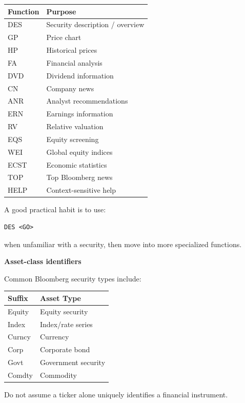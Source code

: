 \documentclass[11pt,letterpaper]{article}
\begin{document}
\begin{center}
\begin{tabularx}{\textwidth}{lX}
\toprule
Function & Purpose \\
\midrule
DES & Security description / overview \\
GP & Price chart \\
HP & Historical prices \\
FA & Financial analysis \\
DVD & Dividend information \\
CN & Company news \\
ANR & Analyst recommendations \\
ERN & Earnings information \\
RV & Relative valuation \\
EQS & Equity screening \\
WEI & Global equity indices \\
ECST & Economic statistics \\
TOP & Top Bloomberg news \\
HELP & Context-sensitive help \\
\bottomrule
\end{tabularx}
\end{center}

A good practical habit is to use:

\begin{lstlisting}
DES <GO>
\end{lstlisting}

when unfamiliar with a security, then move into more specialized functions.

\textbf{Asset-class identifiers}

Common Bloomberg security types include:

\begin{center}
\begin{tabular}{ll}
\toprule
Suffix & Asset Type \\
\midrule
Equity & Equity security \\
Index & Index/rate series \\
Curncy & Currency \\
Corp & Corporate bond \\
Govt & Government security \\
Comdty & Commodity \\
\bottomrule
\end{tabular}
\end{center}

Do not assume a ticker alone uniquely identifies a financial instrument.
\end{document}
